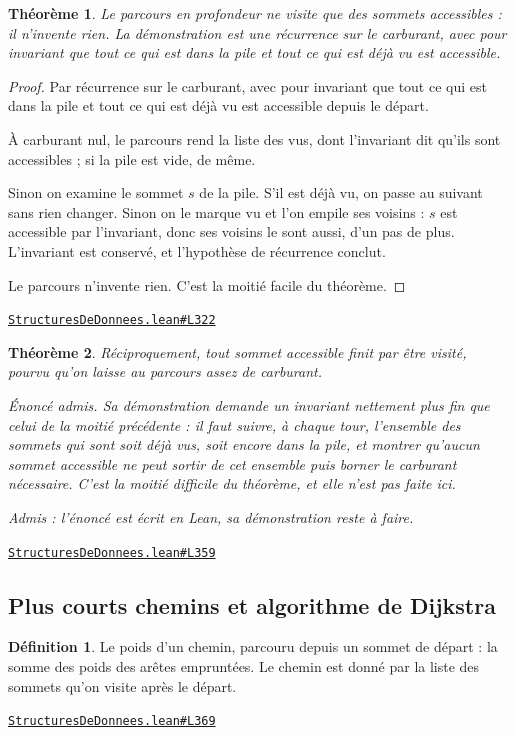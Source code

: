 \documentclass[11pt,a4paper]{article}
\theoremstyle{definition}
\newtheorem{definition}{Définition}
\theoremstyle{plain}
\newtheorem{theoreme}{Théorème}
\newcommand{\admis}{\par\smallskip\noindent\textit{Admis : l'énoncé est écrit en Lean, sa démonstration reste à faire.}\par}
\newcommand{\source}[2]{\par\smallskip\noindent\hfill{\footnotesize\href{#1}{\texttt{#2}}}\par\smallskip}
\begin{document}
\begin{theoreme}
Le parcours en profondeur ne visite que des sommets accessibles : il n'invente
rien. La démonstration est une récurrence sur le carburant, avec pour invariant que
tout ce qui est dans la pile et tout ce qui est déjà vu est accessible.
\end{theoreme}
\begin{proof}
Par récurrence sur le carburant, avec pour invariant que tout ce qui est dans la pile et
tout ce qui est déjà vu est accessible depuis le départ.

À carburant nul, le parcours rend la liste des vus, dont l'invariant dit qu'ils sont
accessibles ; si la pile est vide, de même.

Sinon on examine le sommet \(s\) de la pile. S'il est déjà vu, on passe au suivant sans
rien changer. Sinon on le marque vu et l'on empile ses voisins : \(s\) est accessible par
l'invariant, donc ses voisins le sont aussi, d'un pas de plus. L'invariant est conservé,
et l'hypothèse de récurrence conclut.

Le parcours n'invente rien. C'est la moitié facile du théorème.
\end{proof}
\source{https://github.com/Commutator-IO/learn-lean/blob/main/courses/02-lycee/11-informatique-nsi/StructuresDeDonnees.lean\#L322}{StructuresDeDonnees.lean\#L322}

\begin{theoreme}
Réciproquement, tout sommet accessible finit par être visité, pourvu qu'on laisse
au parcours assez de carburant.

Énoncé admis. Sa démonstration demande un invariant nettement plus fin que celui de
la moitié précédente : il faut suivre, à chaque tour, l'ensemble des sommets qui sont
soit déjà vus, soit encore dans la pile, et montrer qu'aucun sommet accessible ne peut
sortir de cet ensemble \textemdash{} puis borner le carburant nécessaire. C'est la moitié
difficile du théorème, et elle n'est pas faite ici.
\end{theoreme}
\admis
\source{https://github.com/Commutator-IO/learn-lean/blob/main/courses/02-lycee/11-informatique-nsi/StructuresDeDonnees.lean\#L359}{StructuresDeDonnees.lean\#L359}

\subsection{Plus courts chemins et algorithme de Dijkstra}

\begin{definition}
Le poids d'un chemin, parcouru depuis un sommet de départ : la somme des poids des
arêtes empruntées. Le chemin est donné par la liste des sommets qu'on visite après le
départ.
\end{definition}
\source{https://github.com/Commutator-IO/learn-lean/blob/main/courses/02-lycee/11-informatique-nsi/StructuresDeDonnees.lean\#L369}{StructuresDeDonnees.lean\#L369}
\end{document}
